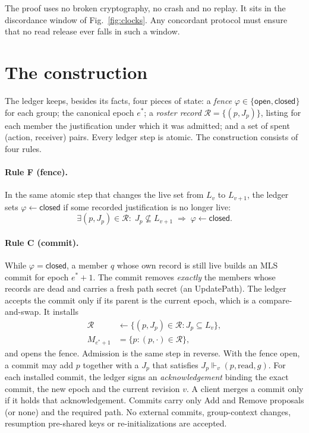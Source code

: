 \documentclass[aps,prx,reprint,superscriptaddress,nofootinbib,floatfix]{revtex4-2}
\theoremstyle{remark}
\newcommand{\Live}{L}                     %
\newcommand{\justifies}{\Vdash}           %
\newcommand{\roster}{M}
\newcommand{\rec}{\mathcal R}             %
\newcommand{\open}{\textsf{open}}
\newcommand{\closed}{\textsf{closed}}
\begin{document}
The proof uses no broken cryptography, no crash and no replay. It sits in the discordance window of Fig.~\ref{fig:clocks}. Any concordant protocol must ensure that no read release ever falls in such a window.

\section{The construction}\label{sec:construction}

The ledger keeps, besides its facts, four pieces of state: a \emph{fence} $\varphi\in\{\open,\closed\}$ for each group; the canonical epoch $e^\ast$; a \emph{roster record} $\rec=\{(p,J_p)\}$, listing for each member the justification under which it was admitted; and a set of spent (action, receiver) pairs. Every ledger step is atomic. The construction consists of four rules.

\paragraph*{Rule F (fence).} In the same atomic step that changes the live set from $\Live_v$ to $\Live_{v+1}$, the ledger sets $\varphi\gets\closed$ if some recorded justification is no longer live:
\begin{equation}
\exists (p,J_p)\in\rec:\; J_p\not\subseteq \Live_{v+1}\;\Longrightarrow\;\varphi\gets\closed .
\label{eq:ruleF}
\end{equation}

\paragraph*{Rule C (commit).} While $\varphi=\closed$, a member $q$ whose own record is still live builds an MLS commit for epoch $e^\ast{+}1$. The commit removes \emph{exactly} the members whose records are dead and carries a fresh path secret (an UpdatePath). The ledger accepts the commit only if its parent is the current epoch, which is a compare-and-swap. It installs
\begin{equation}
\begin{aligned}
\rec&\gets\{(p,J_p)\in\rec: J_p\subseteq \Live_v\},\\
\roster_{e^\ast+1}&=\{p:(p,\cdot)\in\rec\},
\end{aligned}
\label{eq:ruleC}
\end{equation}
and opens the fence. Admission is the same step in reverse. With the fence open, a commit may add $p$ together with a $J_p$ that satisfies $J_p\justifies_v(p,\text{read},g)$. For each installed commit, the ledger signs an \emph{acknowledgement} binding the exact commit, the new epoch and the current revision $v$. A client merges a commit only if it holds that acknowledgement. Commits carry only Add and Remove proposals (or none) and the required path. No external commits, group-context changes, resumption pre-shared keys or re-initializations are accepted.
\end{document}
